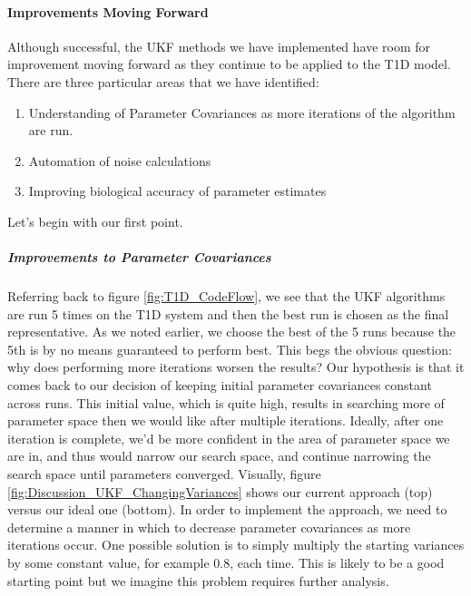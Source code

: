 \paragraph{Improvements Moving Forward} \label{section:UKF_FutureImprovements}
Although successful, the UKF methods we have implemented have room for improvement moving forward as they continue to be applied to the T1D model. There are three particular areas that we have identified:
\begin{enumerate}
    \item Understanding of Parameter Covariances as more iterations of the algorithm are run.
    \item Automation of noise calculations
    \item Improving biological accuracy of parameter estimates
\end{enumerate}
Let's begin with our first point.
\subparagraph{Improvements to Parameter Covariances}
Referring back to figure \ref{fig:T1D_CodeFlow}, we see that the UKF algorithms are run 5 times on the T1D system and then the best run is chosen as the final representative. As we noted earlier, we choose the best of the 5 runs because the 5th is by no means guaranteed to perform best. This begs the obvious question: why does performing more iterations worsen the results? Our hypothesis is that it comes back to our decision of keeping initial parameter covariances constant across runs. This initial value, which is quite high, results in searching more of parameter space then we would like after multiple iterations. Ideally, after one iteration is complete, we'd be more confident in the area of parameter space we are in, and thus would narrow our search space, and continue narrowing the search space until parameters converged. Visually, figure \ref{fig:Discussion_UKF_ChangingVariances} shows our current approach (top) versus our ideal one (bottom). In order to implement the approach, we need to determine a manner in which to decrease parameter covariances as more iterations occur. One possible solution is to simply multiply the starting variances by some constant value, for example 0.8, each time. This is likely to be a good starting point but we imagine this problem requires further analysis.

